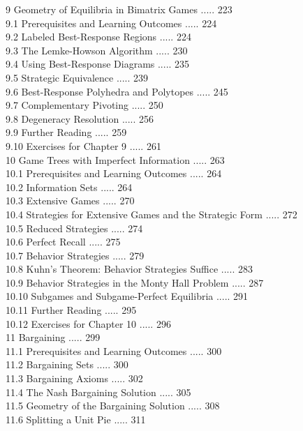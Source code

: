 \documentclass[12pt]{article}
\begin{document}
9 Geometry of Equilibria in Bimatrix Games ..... 223\\
9.1 Prerequisites and Learning Outcomes ..... 224\\
9.2 Labeled Best-Response Regions ..... 224\\
9.3 The Lemke-Howson Algorithm ..... 230\\
9.4 Using Best-Response Diagrams ..... 235\\
9.5 Strategic Equivalence ..... 239\\
9.6 Best-Response Polyhedra and Polytopes ..... 245\\
9.7 Complementary Pivoting ..... 250\\
9.8 Degeneracy Resolution ..... 256\\
9.9 Further Reading ..... 259\\
9.10 Exercises for Chapter 9 ..... 261\\
10 Game Trees with Imperfect Information ..... 263\\
10.1 Prerequisites and Learning Outcomes ..... 264\\
10.2 Information Sets ..... 264\\
10.3 Extensive Games ..... 270\\
10.4 Strategies for Extensive Games and the Strategic Form ..... 272\\
10.5 Reduced Strategies ..... 274\\
10.6 Perfect Recall ..... 275\\
10.7 Behavior Strategies ..... 279\\
10.8 Kuhn's Theorem: Behavior Strategies Suffice ..... 283\\
10.9 Behavior Strategies in the Monty Hall Problem ..... 287\\
10.10 Subgames and Subgame-Perfect Equilibria ..... 291\\
10.11 Further Reading ..... 295\\
10.12 Exercises for Chapter 10 ..... 296\\
11 Bargaining ..... 299\\
11.1 Prerequisites and Learning Outcomes ..... 300\\
11.2 Bargaining Sets ..... 300\\
11.3 Bargaining Axioms ..... 302\\
11.4 The Nash Bargaining Solution ..... 305\\
11.5 Geometry of the Bargaining Solution ..... 308\\
11.6 Splitting a Unit Pie ..... 311\\
\end{document}
